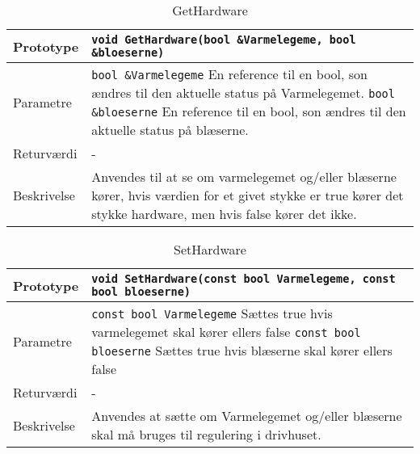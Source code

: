 \begin{table}[h]
\begin{tabularx}{\textwidth}{| >{\raggedright\arraybackslash}p{2.5 cm} | >{\raggedright\arraybackslash}X |} \hline
Prototype & \texttt{void GetHardware(bool \&Varmelegeme, bool \&bloeserne)} \\\hline
Parametre & \texttt{bool \&Varmelegeme} \newline En reference til en bool, son ændres til den aktuelle status på Varmelegemet.
\newline
\texttt{bool \&bloeserne} \newline En reference til en bool, son ændres til den aktuelle status på blæserne.
 \\\hline
Returværdi & - \\\hline
Beskrivelse & Anvendes til at se om varmelegemet og/eller blæserne kører, hvis værdien for et givet stykke er true kører det stykke hardware, men hvis false kører det ikke. \\\hline
\end{tabularx}
\caption{GetHardware}
\label{table:GetHardware}
\end{table}

\begin{table}[h]
\begin{tabularx}{\textwidth}{| >{\raggedright\arraybackslash}p{2.5 cm} | >{\raggedright\arraybackslash}X |} \hline
Prototype & \texttt{void SetHardware(const bool Varmelegeme, const bool bloeserne)} \\\hline
Parametre & \texttt{const bool Varmelegeme} \newline Sættes true hvis varmelegemet skal kører ellers false
\newline
\texttt{const bool bloeserne} \newline Sættes true hvis blæserne skal kører ellers false
 \\\hline
Returværdi & - \\\hline
Beskrivelse & Anvendes at sætte om Varmelegemet og/eller blæserne skal må bruges til regulering i drivhuset. \\\hline
\end{tabularx}
\caption{SetHardware}
\label{table:SetHardware}
\end{table}

